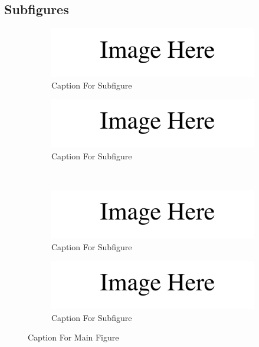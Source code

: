 \subsection{Subfigures}

\begin{figure}[!ht]
	\begin{subfigure}[t]{.45\linewidth}
		\centering\includegraphics[width=0.9\linewidth]{./img/Dummy.pdf}
		\caption{Caption For Subfigure}
		\label{fig: Label For Subfigure a}
	\end{subfigure}
	\begin{subfigure}[t]{.45\linewidth}
		\centering\includegraphics[width=0.9\linewidth]{./img/Dummy.pdf}
		\caption{Caption For Subfigure}
		\label{fig: Label For Subfigure b}
	\end{subfigure}
	\\
	\begin{subfigure}[t]{.45\linewidth}
		\centering\includegraphics[width=0.9\linewidth]{./img/Dummy.pdf}
		\caption{Caption For Subfigure}
		\label{fig: Label For Subfigure c}
	\end{subfigure}
	\begin{subfigure}[t]{.45\linewidth}
		\centering\includegraphics[width=0.9\linewidth]{./img/Dummy.pdf}
		\caption{Caption For Subfigure}
		\label{fig: Label For Subfigure d}
	\end{subfigure}
	\caption{Caption For Main Figure}
	\label{fig: Label For Main Figure}
\end{figure}


